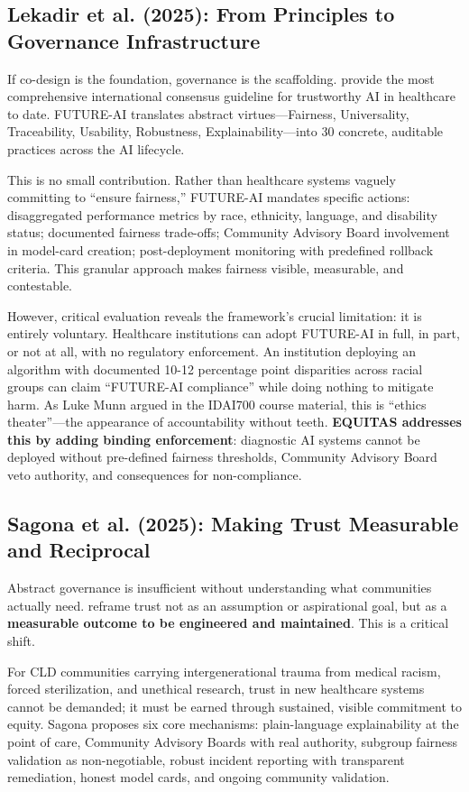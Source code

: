 \documentclass[12pt,a4paper]{article}
\begin{document}
\subsection{Lekadir et al. (2025): From Principles to Governance Infrastructure}

If co-design is the foundation, governance is the scaffolding. \citet{Lekadir2025} provide the most comprehensive international consensus guideline for trustworthy AI in healthcare to date. FUTURE-AI translates abstract virtues---Fairness, Universality, Traceability, Usability, Robustness, Explainability---into 30 concrete, auditable practices across the AI lifecycle.

This is no small contribution. Rather than healthcare systems vaguely committing to ``ensure fairness,'' FUTURE-AI mandates specific actions: disaggregated performance metrics by race, ethnicity, language, and disability status; documented fairness trade-offs; Community Advisory Board involvement in model-card creation; post-deployment monitoring with predefined rollback criteria. This granular approach makes fairness visible, measurable, and contestable.

However, critical evaluation reveals the framework's crucial limitation: it is entirely voluntary. Healthcare institutions can adopt FUTURE-AI in full, in part, or not at all, with no regulatory enforcement. An institution deploying an algorithm with documented 10-12 percentage point disparities across racial groups can claim ``FUTURE-AI compliance'' while doing nothing to mitigate harm. As Luke Munn argued in the IDAI700 course material, this is ``ethics theater''---the appearance of accountability without teeth. \textbf{EQUITAS addresses this by adding binding enforcement}: diagnostic AI systems cannot be deployed without pre-defined fairness thresholds, Community Advisory Board veto authority, and consequences for non-compliance.

\subsection{Sagona et al. (2025): Making Trust Measurable and Reciprocal}

Abstract governance is insufficient without understanding what communities actually need. \citet{Sagona2025} reframe trust not as an assumption or aspirational goal, but as a \textbf{measurable outcome to be engineered and maintained}. This is a critical shift.

For CLD communities carrying intergenerational trauma from medical racism, forced sterilization, and unethical research, trust in new healthcare systems cannot be demanded; it must be earned through sustained, visible commitment to equity. Sagona proposes six core mechanisms: plain-language explainability at the point of care, Community Advisory Boards with real authority, subgroup fairness validation as non-negotiable, robust incident reporting with transparent remediation, honest model cards, and ongoing community validation.
\end{document}
